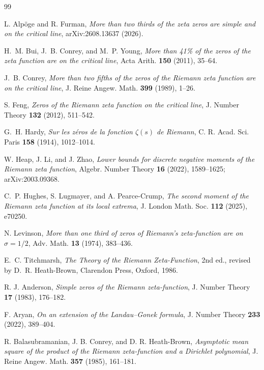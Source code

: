 \begin{thebibliography}{99}

L. Alp\"oge and R. Furman,
\emph{More than two thirds of the zeta zeros are simple and on the critical line},
arXiv:2608.13637 (2026).

H.~M. Bui, J.~B. Conrey, and M.~P. Young,
\emph{More than 41\% of the zeros of the zeta function are on the critical line},
Acta Arith. \textbf{150} (2011), 35--64.

J.~B. Conrey,
\emph{More than two fifths of the zeros of the Riemann zeta function are on the critical line},
J. Reine Angew. Math. \textbf{399} (1989), 1--26.

S. Feng,
\emph{Zeros of the Riemann zeta function on the critical line},
J. Number Theory \textbf{132} (2012), 511--542.

G.~H. Hardy,
\emph{Sur les z\'eros de la fonction $\zeta(s)$ de Riemann},
C. R. Acad. Sci. Paris \textbf{158} (1914), 1012--1014.

W. Heap, J. Li, and J. Zhao,
\emph{Lower bounds for discrete negative moments of the Riemann zeta function},
Algebr. Number Theory \textbf{16} (2022), 1589--1625;
arXiv:2003.09368.

C.~P. Hughes, S. Lugmayer, and A. Pearce-Crump,
\emph{The second moment of the Riemann zeta function at its local extrema},
J. London Math. Soc. \textbf{112} (2025), e70250.

N. Levinson,
\emph{More than one third of zeros of Riemann's zeta-function are on $\sigma=1/2$},
Adv. Math. \textbf{13} (1974), 383--436.

E.~C. Titchmarsh,
\emph{The Theory of the Riemann Zeta-Function},
2nd ed., revised by D.~R. Heath-Brown, Clarendon Press, Oxford, 1986.

R. J. Anderson,
\emph{Simple zeros of the Riemann zeta-function},
J. Number Theory \textbf{17} (1983), 176--182.

F. Aryan,
\emph{On an extension of the Landau--Gonek formula},
J. Number Theory \textbf{233} (2022), 389--404.

R. Balasubramanian, J. B. Conrey, and D. R. Heath-Brown,
\emph{Asymptotic mean square of the product of the Riemann zeta-function and a Dirichlet polynomial},
J. Reine Angew. Math. \textbf{357} (1985), 161--181.


\end{thebibliography}
